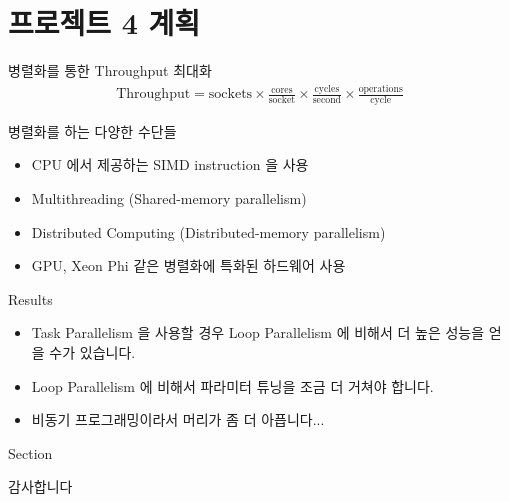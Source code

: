 \documentclass{bredelebeamer}
\begin{document}
\section{프로젝트 4 계획}
\begin{frame}{병렬화를 통한 Throughput 최대화}
  \begin{align*}
    \text{Throughput} = \text{sockets} \times
    \frac{\text{cores}}{\text{socket}} \times
    \frac{\text{cycles}}{\text{second}} \times
    \frac{\text{operations}}{\text{cycle}}
  \end{align*}

  \begin{block}{병렬화를 하는 다양한 수단들}
    \begin{itemize}
    \item CPU 에서 제공하는 SIMD instruction 을 사용
    \item Multithreading (Shared-memory parallelism)
    \item Distributed Computing (Distributed-memory parallelism)
    \item GPU, Xeon Phi 같은 병렬화에 특화된 하드웨어 사용
    \end{itemize}
  \end{block}
\end{frame}

\begin{frame}[fragile]{Results}
  \begin{itemize}
    \item Task Parallelism 을 사용할 경우 Loop Parallelism 에 비해서 더 높은 성능을 얻을 수가 있습니다.
    \item Loop Parallelism 에 비해서 파라미터 튜닝을 조금 더 거쳐야 합니다.
    \item 비동기 프로그래밍이라서 머리가 좀 더 아픕니다...
  \end{itemize}
\end{frame}

\begin{frame}[fragile]{Section}
  \begin{center}
    감사합니다
  \end{center}
\end{frame}
\end{document}
